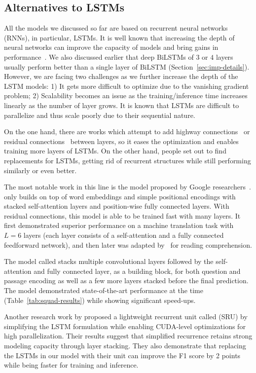 \subsection{Alternatives to LSTMs}
\label{sec:alt-lstms}
All the models we discussed so far are based on recurrent neural networks (RNNs), in particular, LSTMs. It is well known that increasing the depth of neural networks can improve the capacity of models and bring gains in performance~\cite{he2016deep}. We also discussed earlier that deep BiLSTMs of $3$ or $4$ layers usually perform better than a single layer of BiLSTM (Section~\ref{sec:imp-details}). However, we are facing two challenges as we further increase the depth of the LSTM models: 1) It gets more difficult to optimize due to the vanishing gradient problem; 2) Scalability becomes an issue as the training/inference time increases linearly as the number of layer grows. It is known that LSTMs are difficult to parallelize and thus scale poorly due to their sequential nature.

On the one hand, there are works which attempt to add highway connections~\cite{srivastava2015training} or residual connections~\cite{he2016deep} between layers, so it eases the optimization and enables training more layers of LSTMs. On the other hand, people set out to find replacements for LSTMs, getting rid of recurrent structures while still performing similarly or even better.

The most notable work in this line is the  model proposed by Google researchers~\cite{vaswani2017attention}.  only builds on top of word embeddings and simple positional encodings with stacked self-attention layers and position-wise fully connected layers. With residual connections, this model is able to be trained fast with many layers. It first demonstrated superior performance on a machine translation task with $L = 6$ layers (each layer consists of a self-attention and a fully connected feedforward network), and then later was adapted by~\cite{yu2018qanet} for reading comprehension.

The model called  \cite{yu2018qanet} stacks multiple convolutional layers followed by the self-attention and fully connected layer, as a building block, for both question and passage encoding as well as a few more layers stacked before the final prediction. The model demonstrated state-of-the-art performance at the time (Table~\ref{tab:squad-results}) while showing significant speed-ups.

Another research work by  proposed a lightweight recurrent unit called  (SRU) by simplifying the LSTM formulation while enabling CUDA-level optimizations for high parallelization. Their results suggest that simplified recurrence retains strong modeling capacity through layer stacking. They also demonstrate that replacing the LSTMs in our model with their  unit can improve the F1 score by 2 points while being faster for training and inference.

